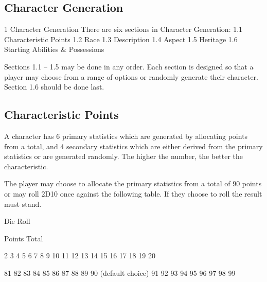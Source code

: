\documentclass[a4paper]{article}
\begin{document}
\begin{multicols}{3}

\section{Character Generation}

1 Character Generation
There are six sections in Character Generation:
1.1 Characteristic Points
1.2 Race
1.3 Description
1.4 Aspect
1.5 Heritage
1.6 Starting Abilities \& Possessions

Sections 1.1 – 1.5 may be done in any order. Each
section is designed so that a player may choose
from a range of options or randomly generate their
character. Section 1.6 should be done last.

\subsection{Characteristic Points}

A character has 6 primary statistics which are
generated by allocating points from a total, and 4
secondary statistics which are either derived from
the primary statistics or are generated randomly.
The higher the number, the better the characteristic.


The player may choose to allocate the primary statistics from a total
of 90 points or may roll 2D10 once against the following table. If
they choose to roll the result must stand.

Die Roll

Points Total

2
3
4
5
6
7
8
9
10
11
12
13
14
15
16
17
18
19
20

81
82
83
84
85
86
87
88
89
90 (default choice)
91
92
93
94
95
96
97
98
99


\end{multicols}
\end{document}
